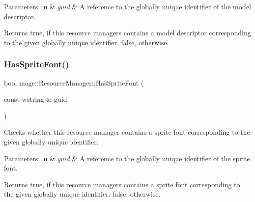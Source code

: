 \begin{DoxyParams}[1]{Parameters}
\mbox{\tt in}  & {\em guid} & A reference to the globally unique identifier of the model descriptor. \\
\hline
\end{DoxyParams}
\begin{DoxyReturn}{Returns}
{\ttfamily true}, if this resource managers contains a model descriptor corresponding to the given globally unique identifier. {\ttfamily false}, otherwise. 
\end{DoxyReturn}
\hypertarget{classmage_1_1_resource_manager_a505a5b25923d88020d85a2f3307e4b7f}{}\label{classmage_1_1_resource_manager_a505a5b25923d88020d85a2f3307e4b7f} 
\subsubsection{\texorpdfstring{Has\+Sprite\+Font()}{HasSpriteFont()}}
{\footnotesize\ttfamily bool mage\+::\+Resource\+Manager\+::\+Has\+Sprite\+Font (\begin{DoxyParamCaption}\item[{const wstring \&}]{guid }\end{DoxyParamCaption})\hspace{0.3cm}{\ttfamily [noexcept]}}

Checks whether this resource manager contains a sprite font corresponding to the given globally unique identifier.


\begin{DoxyParams}[1]{Parameters}
\mbox{\tt in}  & {\em guid} & A reference to the globally unique identifier of the sprite font. \\
\hline
\end{DoxyParams}
\begin{DoxyReturn}{Returns}
{\ttfamily true}, if this resource managers contains a sprite font corresponding to the given globally unique identifier. {\ttfamily false}, otherwise. 
\end{DoxyReturn}
\hypertarget{classmage_1_1_resource_manager_ae1a4a3a8d98ecbf3c585464d0edd0c9f}{}\label{classmage_1_1_resource_manager_ae1a4a3a8d98ecbf3c585464d0edd0c9f} 
